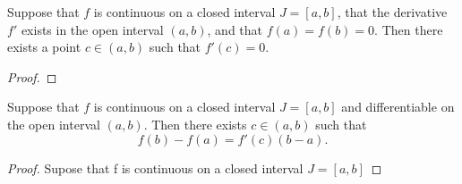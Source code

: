 \begin{theorem}
    Suppose that $f$ is continuous on a closed interval $J = [a,b]$, that the 
    derivative $f'$ exists in the open interval $(a,b)$, and that 
    $f(a) = f(b) = 0$. Then there exists a point $c \in (a,b)$ such that 
    $f'(c) = 0$.
\end{theorem}
\begin{proof}

\end{proof}
\begin{theorem}
	Suppose that $f$ is continuous on a closed interval $J = [a,b]$ and 
	differentiable on the open interval $(a,b)$. Then there exists $c \in (a,b)$
	such that 
	$$
	    f(b) - f(a) = f'(c)(b - a).
	$$
\end{theorem}
\begin{proof}
    Supose that f is continuous on a closed interval $J=[a,b]$
\end{proof}


